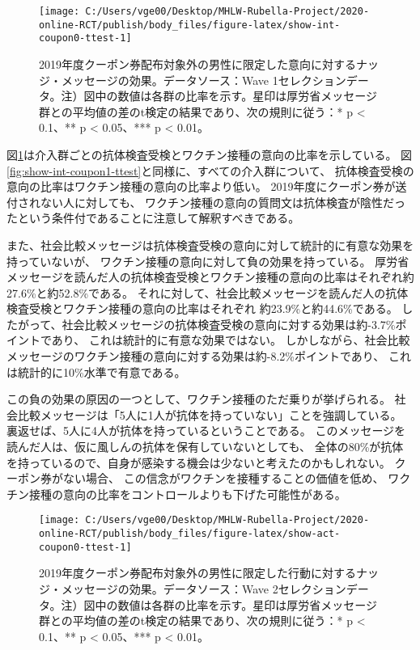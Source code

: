 \documentclass[
  11pt,
  a4paper,
]{article}
\begin{document}
\begin{figure}[t]
\texttt{[image: C:/Users/vge00/Desktop/MHLW-Rubella-Project/2020-online-RCT/publish/body\_files/figure-latex/show-int-coupon0-ttest-1]} \caption{2019年度クーポン券配布対象外の男性に限定した意向に対するナッジ・メッセージの効果。データソース：Wave 1セレクションデータ。注）図中の数値は各群の比率を示す。星印は厚労省メッセージ群との平均値の差のt検定の結果であり、次の規則に従う：* p < 0.1、** p < 0.05、*** p < 0.01。}\label{fig:show-int-coupon0-ttest}
\end{figure}

図\ref{fig:show-int-coupon0-ttest}は介入群ごとの抗体検査受検とワクチン接種の意向の比率を示している。
図\ref{fig:show-int-coupon1-ttest}と同様に、すべての介入群について、
抗体検査受検の意向の比率はワクチン接種の意向の比率より低い。
2019年度にクーポン券が送付されない人に対しても、
ワクチン接種の意向の質問文は抗体検査が陰性だったという条件付であることに注意して解釈すべきである。

また、社会比較メッセージは抗体検査受検の意向に対して統計的に有意な効果を持っていないが、
ワクチン接種の意向に対して負の効果を持っている。
厚労省メッセージを読んだ人の抗体検査受検とワクチン接種の意向の比率はそれぞれ約27.6\%と約52.8\%である。
それに対して、社会比較メッセージを読んだ人の抗体検査受検とワクチン接種の意向の比率はそれぞれ
約23.9\%と約44.6\%である。
したがって、社会比較メッセージの抗体検査受検の意向に対する効果は約-3.7\%ポイントであり、
これは統計的に有意な効果ではない。
しかしながら、社会比較メッセージのワクチン接種の意向に対する効果は約-8.2\%ポイントであり、
これは統計的に10\%水準で有意である。

この負の効果の原因の一つとして、ワクチン接種のただ乗りが挙げられる。
社会比較メッセージは「5人に1人が抗体を持っていない」ことを強調している。
裏返せば、5人に4人が抗体を持っているということである。
このメッセージを読んだ人は、仮に風しんの抗体を保有していないとしても、
全体の80\%が抗体を持っているので、自身が感染する機会は少ないと考えたのかもしれない。
クーポン券がない場合、
この信念がワクチンを接種することの価値を低め、
ワクチン接種の意向の比率をコントロールよりも下げた可能性がある。

\begin{figure}[t]
\texttt{[image: C:/Users/vge00/Desktop/MHLW-Rubella-Project/2020-online-RCT/publish/body\_files/figure-latex/show-act-coupon0-ttest-1]} \caption{2019年度クーポン券配布対象外の男性に限定した行動に対するナッジ・メッセージの効果。データソース：Wave 2セレクションデータ。注）図中の数値は各群の比率を示す。星印は厚労省メッセージ群との平均値の差のt検定の結果であり、次の規則に従う：* p < 0.1、** p < 0.05、*** p < 0.01。}\label{fig:show-act-coupon0-ttest}
\end{figure}
\end{document}
